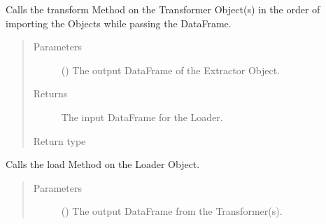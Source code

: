 \documentclass[a4paper,10pt, twoside,english]{sphinxmanual}
\begin{document}
\begin{fulllineitems}
\begin{fulllineitems}
\begin{quote}
\begin{description}
\end{description}\end{quote}

\end{fulllineitems}


\begin{fulllineitems}
\label{\detokenize{pipeline/pipeline:spooq2.pipeline.pipeline.Pipeline.transform}}
Calls the transform Method on the Transformer Object(s) in the order of importing the
Objects while passing the DataFrame.
\begin{quote}\begin{description}
\item[{Parameters}] \leavevmode
{} () \textendash{} The output DataFrame of the Extractor Object.

\item[{Returns}] \leavevmode
The input DataFrame for the Loader.

\item[{Return type}] \leavevmode
{}

\end{description}\end{quote}

\end{fulllineitems}


\begin{fulllineitems}
\label{\detokenize{pipeline/pipeline:spooq2.pipeline.pipeline.Pipeline.load}}
Calls the load Method on the Loader Object.
\begin{quote}\begin{description}
\item[{Parameters}] \leavevmode
{} () \textendash{} The output DataFrame from the Transformer(s).


\end{description}
\end{quote}
\end{fulllineitems}
\end{fulllineitems}
\end{document}
